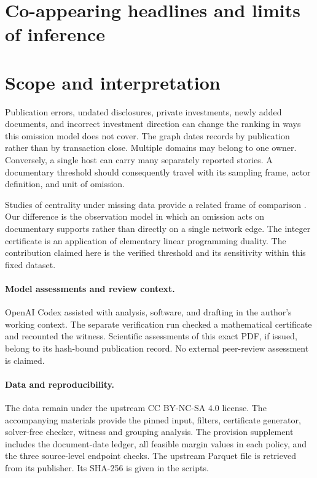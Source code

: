 \documentclass[11pt]{article}
\begin{document}
\section{Co-appearing headlines and limits of inference}






\section{Scope and interpretation}
Publication errors, undated disclosures, private investments, newly added documents, and incorrect investment direction can change the ranking in ways this omission model does not cover. The graph dates records by publication rather than by transaction close. Multiple domains may belong to one owner. Conversely, a single host can carry many separately reported stories. A documentary threshold should consequently travel with its sampling frame, actor definition, and unit of omission.

Studies of centrality under missing data provide a related frame of comparison \cite{errors}. Our difference is the observation model in which an omission acts on documentary supports rather than directly on a single network edge. The integer certificate is an application of elementary linear programming duality. The contribution claimed here is the verified threshold and its sensitivity within this fixed dataset.

\paragraph{Model assessments and review context.}
OpenAI Codex assisted with analysis, software, and drafting in the author's working context. The separate verification run checked a mathematical certificate and recounted the witness. Scientific assessments of this exact PDF, if issued, belong to its hash-bound publication record. No external peer-review assessment is claimed.

\paragraph{Data and reproducibility.}
The data remain under the upstream CC BY-NC-SA 4.0 license. The accompanying materials provide the pinned input, filters, certificate generator, solver-free checker, witness and grouping analysis. The provision supplement includes the document-date ledger, all feasible margin values in each policy, and the three source-level endpoint checks. The upstream Parquet file is retrieved from its publisher. Its SHA-256 is given in the scripts.
\end{document}
